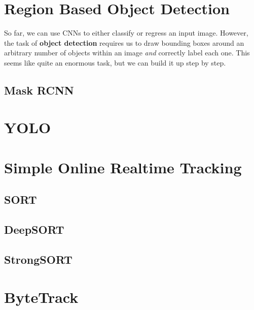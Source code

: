 \documentclass{article}
\begin{document}
\section{Region Based Object Detection}

  So far, we can use CNNs to either classify or regress an input image. However, the task of \textbf{object detection} requires us to draw bounding boxes around an arbitrary number of objects within an image \textit{and} correctly label each one. This seems like quite an enormous task, but we can build it up step by step. 

  \subsection{Mask RCNN}

\section{YOLO}

\section{Simple Online Realtime Tracking} 

  \subsection{SORT}

  \subsection{DeepSORT}

  \subsection{StrongSORT}

\section{ByteTrack}
\end{document}
